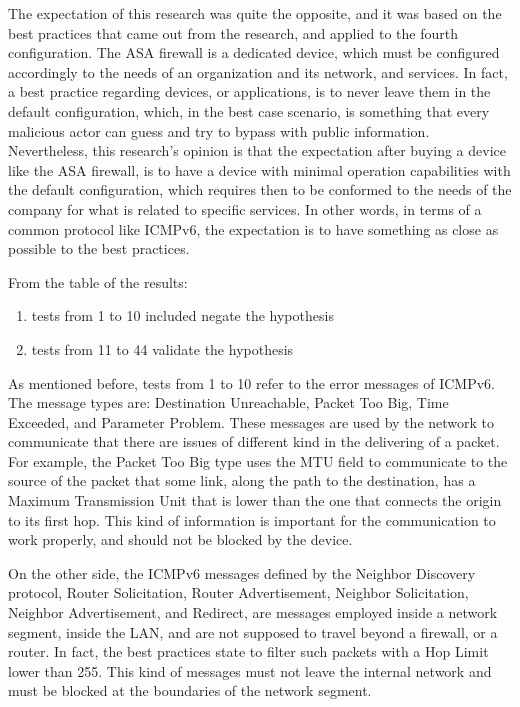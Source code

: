 \documentclass[12pt]{article}
\begin{document}
The expectation of this research was quite the opposite, and it was based on the best practices that came out from the research, and applied to the fourth configuration. The ASA firewall is a dedicated device, which must be configured accordingly to the needs of an organization and its network, and services. In fact, a best practice regarding devices, or applications, is to never leave them in the default configuration, which, in the best case scenario, is something that every malicious actor can guess and try to bypass with public information. Nevertheless, this research's opinion is that the expectation after buying a device like the ASA firewall, is to have a device with minimal operation capabilities with the default configuration, which requires then to be conformed to the needs of the company for what is related to specific services. In other words, in terms of a common protocol like ICMPv6, the expectation is to have something as close as possible to the best practices.

From the table of the results:
\begin{enumerate}[noitemsep,topsep=0pt,partopsep=0pt]
 \item tests from 1 to 10 included negate the hypothesis
 \item tests from 11 to 44 validate the hypothesis
\end{enumerate}

As mentioned before, tests from 1 to 10 refer to the error messages of ICMPv6. The message types are: Destination Unreachable, Packet Too Big, Time Exceeded, and Parameter Problem. These messages are used by the network to communicate that there are issues of different kind in the delivering of a packet. For example, the Packet Too Big type uses the MTU field to communicate to the source of the packet that some link, along the path to the destination, has a Maximum Transmission Unit that is lower than the one that connects the origin to its first hop. This kind of information is important for the communication to work properly, and should not be blocked by the device.

On the other side, the ICMPv6 messages defined by the Neighbor Discovery protocol, Router Solicitation, Router Advertisement, Neighbor Solicitation, Neighbor Advertisement, and Redirect, are messages employed inside a network segment, inside the LAN, and are not supposed to travel beyond a firewall, or a router. In fact, the best practices state to filter such packets with a Hop Limit lower than 255. This kind of messages must not leave the internal network and must be blocked at the boundaries of the network segment.
\end{document}
